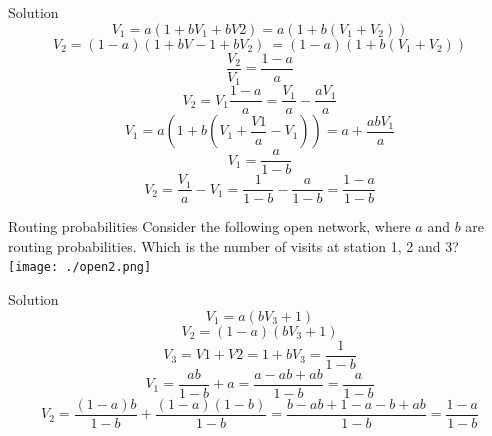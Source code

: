 \documentclass[]{beamer}
\begin{document}
\begin{frame}{Solution}
\[V_1 = a  (1 + b  V_1 + b  V2) = a  (1 + b  (V_1+V_2))\]
\[V_2 = (1-a)(1+ b V-1+ b V_2)\ = (1-a)(1+b(V_1+V_2)) \]
\[\frac{V_2}{V_1} = \frac{1-a}{a}\]
\[V_2 = V_1 \frac{1-a}{a} = \frac{V_1}{a} - \frac{a V_1}{a}\]
\[V_1 = a(1+b(V_1+\frac{V1}{a}-V_1)) = a + \frac{a b V_1}{a} \]
\[V_1 = \frac{a}{1-b}\]
\[V_2 = \frac{V_1}{a} - V_1 = \frac{1}{1-b} - \frac{a}{1-b} = \frac{1-a}{1-b}\]
\end{frame}

\begin{frame}{Routing probabilities}
Consider the following open network, where $a$ and $b$ are routing probabilities. 
Which is the number of visits at station 1, 2 and 3?\\
\texttt{[image: ./open2.png]}
\end{frame}

\begin{frame}{Solution}
\[ V_1 = a (b V_3 +1)\]
\[V_2 = (1-a) (bV_3+1)\]
\[V_3 = V1+V2 = 1+bV_3 = \frac{1}{1-b}\]
\[V_1 = \frac{ab}{1-b} + a = \frac{a-ab+ab}{1-b} = \frac{a}{1-b} \]
\[V_2 = \frac{(1-a)b}{1-b} + \frac{(1-a)(1-b)}{1-b} = \frac{b - ab + 1 -a -b +ab}{1-b} = \frac{1-a}{1-b} \]
\end{frame}
\end{document}
